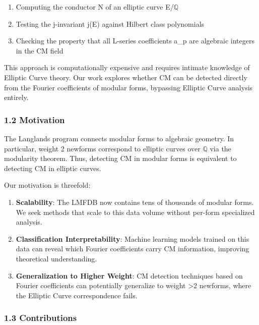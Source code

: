 \documentclass[
]{article}
\providecommand{\tightlist}{%
  \setlength{\itemsep}{0pt}\setlength{\parskip}{0pt}}
\begin{document}
\begin{enumerate}
\def\labelenumi{\arabic{enumi}.}
\tightlist
\item
  Computing the conductor N of an elliptic curve E/$\mathbb{Q}$
\item
  Testing the j-invariant j(E) against Hilbert class polynomials
\item
  Checking the property that all L-series coefficients a\_p are
  algebraic integers in the CM field
\end{enumerate}

This approach is computationally expensive and requires intimate
knowledge of Elliptic Curve theory. Our work explores whether CM can be
detected directly from the Fourier coefficients of modular forms,
bypassing Elliptic Curve analysis entirely.

\hypertarget{motivation}{%
\subsubsection{1.2 Motivation}\label{motivation}}

The Langlands program connects modular forms to algebraic geometry. In
particular, weight 2 newforms correspond to elliptic curves over $\mathbb{Q}$ via
the modularity theorem. Thus, detecting CM in modular forms is
equivalent to detecting CM in elliptic curves.

Our motivation is threefold:

\begin{enumerate}
\def\labelenumi{\arabic{enumi}.}
\item
  \textbf{Scalability}: The LMFDB now contains tens of thousands of
  modular forms. We seek methods that scale to this data volume without
  per-form specialized analysis.
\item
  \textbf{Classification Interpretability}: Machine learning models
  trained on this data can reveal which Fourier coefficients carry CM
  information, improving theoretical understanding.
\item
  \textbf{Generalization to Higher Weight}: CM detection techniques
  based on Fourier coefficients can potentially generalize to weight
  \textgreater2 newforms, where the Elliptic Curve correspondence fails.
\end{enumerate}

\hypertarget{contributions}{%
\subsubsection{1.3 Contributions}\label{contributions}}
\end{document}
